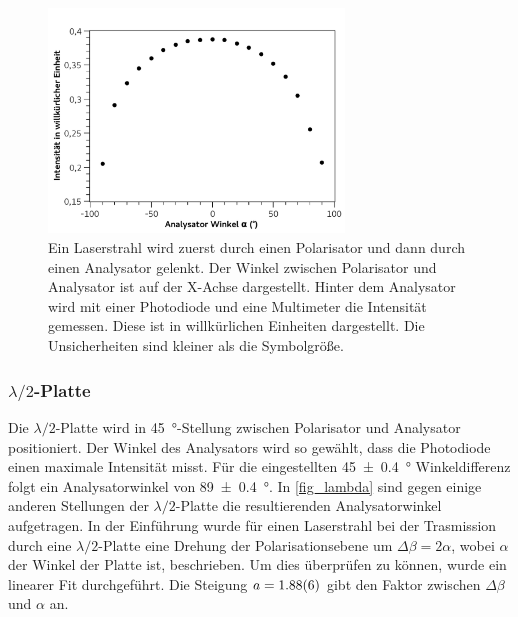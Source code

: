 \documentclass[
	a4paper,
	12pt,
	pagesize,
	ngerman
]{scrartcl}
\begin{document}
	\begin{figure}[H] %
		\includegraphics[width=0.7\textwidth]{fig_Malus1}
		\centering
		\caption{Ein Laserstrahl wird zuerst durch einen Polarisator und dann durch einen Analysator gelenkt. 
		Der Winkel zwischen Polarisator und Analysator ist auf der X-Achse dargestellt. 
		Hinter dem Analysator wird mit einer Photodiode und eine Multimeter die Intensität gemessen. 
		Diese ist in willkürlichen Einheiten dargestellt. 
		Die Unsicherheiten sind kleiner als die Symbolgröße.} 
		\label{fig_Malus1}
		\centering
	\end{figure}
	\subsubsection{$\lambda/2$-Platte}
	Die $\lambda/2$-Platte wird in \SI{45}{\degree}-Stellung zwischen Polarisator und Analysator positioniert.  
	Der Winkel des Analysators wird so gewählt, dass die Photodiode einen maximale Intensität misst.
	Für die eingestellten \SI{45+-0,4}{\degree} Winkeldifferenz folgt ein Analysatorwinkel von \SI{89+-0,4}{\degree}.
	In \cref{fig_lambda} sind gegen einige anderen Stellungen der $\lambda/2$-Platte die resultierenden Analysatorwinkel aufgetragen. 
	In der Einführung wurde für einen Laserstrahl bei der Trasmission durch eine $\lambda/2$-Platte eine Drehung der Polarisationsebene um $\Delta\beta=2\alpha$, wobei $\alpha$ der Winkel der Platte ist, beschrieben.
	Um dies überprüfen zu können, wurde ein linearer Fit durchgeführt.
	Die Steigung $a=\SI{1,88+-0,06}{}$ gibt den Faktor zwischen $\Delta\beta$ und $\alpha$ an.
\end{document}
